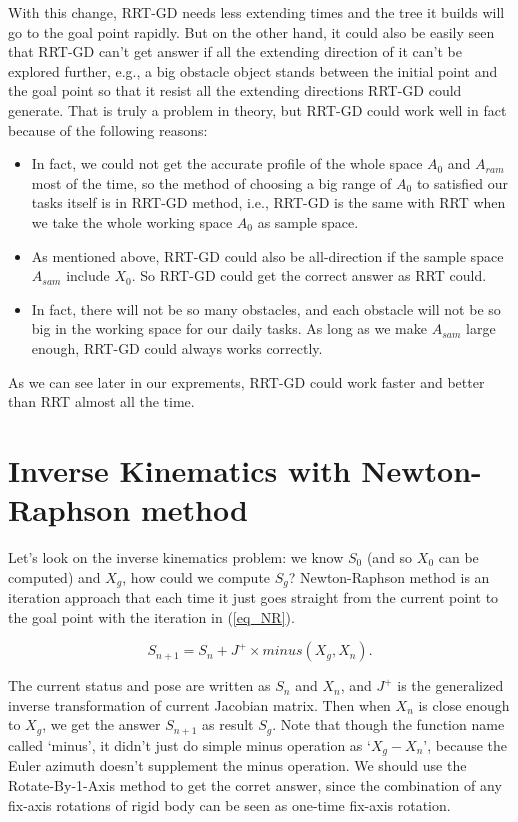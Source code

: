 \documentclass[letterpaper, 10 pt, conference]{ieeeconf}  %
\begin{document}
With this change, RRT-GD needs less extending times and the tree it builds will go to the goal point rapidly. But on the other hand, it could also be easily seen that RRT-GD can't get answer if all the extending direction of it can't be explored further, e.g., a big obstacle object stands between the initial point and the goal point so that it resist all the extending directions RRT-GD could generate. That is truly a problem in theory, but RRT-GD could work well in fact because of the following reasons:

\begin{itemize}

\item In fact, we could not get the accurate profile of the whole space $A_{0}$ and $A_{ram}$ most of the time, so the method of choosing a big range of $A_{0}$ to satisfied our tasks itself is in RRT-GD method, i.e., RRT-GD is the same with RRT when we take the whole working space $A_{0}$ as sample space.
\item  As mentioned above, RRT-GD could also be all-direction if the sample space $A_{sam}$ include $X_{0}$. So RRT-GD could get the correct answer as RRT could.
\item In fact, there will not be so many obstacles, and each obstacle will not be so big in the working space for our daily tasks. As long as we make $A_{sam}$ large enough, RRT-GD could always works correctly.  

\end{itemize} 

As we can see later in our exprements, RRT-GD could work faster and better than RRT almost all the time.

\section{Inverse Kinematics with Newton-Raphson method}

Let's look on the inverse kinematics problem: we know $S_{0}$ (and so $X_{0}$ can be computed) and $X_{g}$, how could we compute $S_{g}$? Newton-Raphson method is an iteration approach that each time it just goes straight from the current point to the goal point with the iteration in (\ref{eq_NR}).

\begin{equation}\label{eq_NR}
S_{n+1} = S_{n} + J^{+} \times minus(X_{g}, X_{n}).
\end{equation}

The current status and pose are written as $S_{n}$ and $X_{n}$, and $J^{+}$ is the generalized inverse transformation of current Jacobian matrix. Then when $X_{n}$ is close enough to $X_{g}$, we get the answer $S_{n+1}$ as result $S_{g}$. Note that though the function name called `minus', it didn't just do simple minus operation as `$X_{g} - X_{n}$', because the Euler azimuth doesn't supplement the minus operation. We should use the Rotate-By-1-Axis method to get the corret answer, since the combination of any fix-axis rotations of rigid body can be seen as one-time fix-axis rotation.
\end{document}

